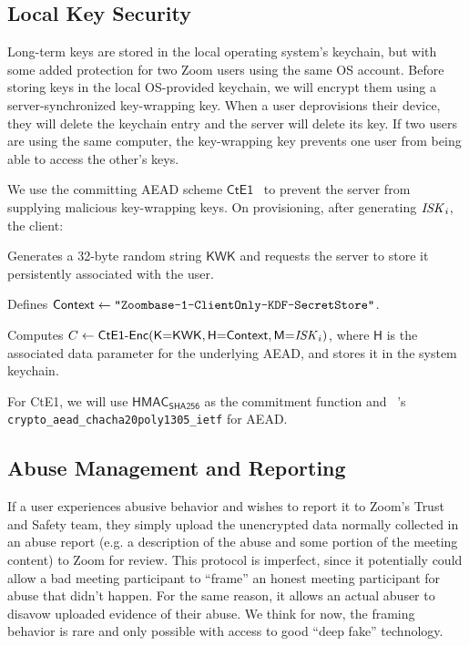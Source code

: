 \subsection{Local Key Security}
\label{subsec:lks}

Long-term keys are stored in the local operating system's keychain, but with some added protection
for two Zoom users using the same OS account.
%
Before storing keys in the local OS-provided keychain, we will encrypt them using a server-synchronized key-wrapping key.
%
When a user deprovisions their device, they will delete the keychain entry and the server will delete its key.
%
If two users are using the same computer, the key-wrapping key prevents one user from being able to access the other's keys.

We use the committing AEAD scheme $\mathsf{CtE1}$~\cite{messagefranking} to prevent the server from supplying malicious key-wrapping keys.
%
On provisioning, after generating $\mathit{ISK}_i$, the client:
\begingroup
\RaggedRight
\begin{enumerate*}
\item Generates a 32-byte random string $\mathsf{KWK}$ and requests the server to store it persistently associated with the user.
\item Defines ${\sf Context} \leftarrow \texttt{"Zoombase-1-ClientOnly-KDF-SecretStore"}$.
\item Computes $C \leftarrow \textsf{CtE1-Enc}(\textsf{K}{=}\textsf{KWK}, \textsf{H}{=}{\sf Context}, \textsf{M}{=}\mathit{ISK}_i)$, where $\textsf{H}$ is the associated data parameter for the underlying AEAD, and stores it in the system keychain.
\end{enumerate*}
\endgroup

For \textsf{CtE1}, we will use $\textsf{HMAC}_{\textsf{SHA256}}$ as the
commitment function and \sodium{}~\cite{libsodium}'s \linebreak \texttt{crypto\_aead\_chacha20poly1305\_ietf} for AEAD.

\subsection{Abuse Management and Reporting}
If a user experiences abusive behavior and wishes to report it to Zoom's Trust and Safety team, they simply upload the unencrypted data normally collected in an abuse report (e.g. a description of the abuse and some portion of the meeting content) to Zoom for review. This protocol is imperfect, since it potentially could allow a bad meeting participant to ``frame'' an honest meeting participant for abuse that didn't happen. For the same reason, it allows an actual abuser to disavow uploaded evidence of their abuse. We think for now, the framing behavior is rare and only possible with access to good ``deep fake'' technology.

